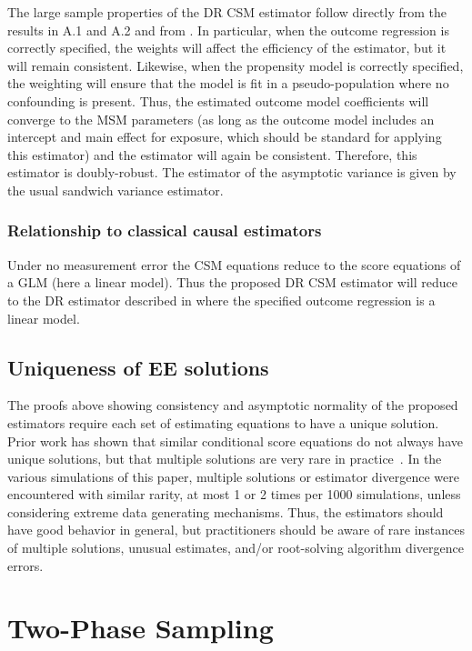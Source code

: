 \documentclass[12pt]{article}
\begin{document}
The large sample properties of the DR CSM estimator follow directly from the results in A.1 and A.2 and from \citet{kang2007}. In particular, when the outcome regression is correctly specified, the weights will affect the efficiency of the estimator, but it will remain consistent. Likewise, when the propensity model is correctly specified, the weighting will ensure that the model is fit in a pseudo-population where no confounding is present. Thus, the estimated outcome model coefficients will converge to the MSM parameters (as long as the outcome model includes an intercept and main effect for exposure, which should be standard for applying this estimator) and the estimator will again be consistent. Therefore, this estimator is doubly-robust. The estimator of the asymptotic variance is given by the usual sandwich variance estimator.

\subsubsection{Relationship to classical causal estimators}

Under no measurement error the CSM equations reduce to the score equations of a GLM (here a linear model). Thus the proposed DR CSM estimator will reduce to the DR estimator described in \citet{kang2007} where the specified outcome regression is a linear model.

\subsection{Uniqueness of EE solutions}

The proofs above showing consistency and asymptotic normality of the proposed estimators require each set of estimating equations to have a unique solution. Prior work has shown that similar conditional score equations do not always have unique solutions, but that multiple solutions are very rare in practice~\citep{stefanski1987}. In the various simulations of this paper, multiple solutions or estimator divergence were encountered with similar rarity, at most 1 or 2 times per 1000 simulations, unless considering extreme data generating mechanisms. Thus, the estimators should have good behavior in general, but practitioners should be aware of rare instances of multiple solutions, unusual estimates, and/or root-solving algorithm divergence errors.

\section{Two-Phase Sampling}
\end{document}
